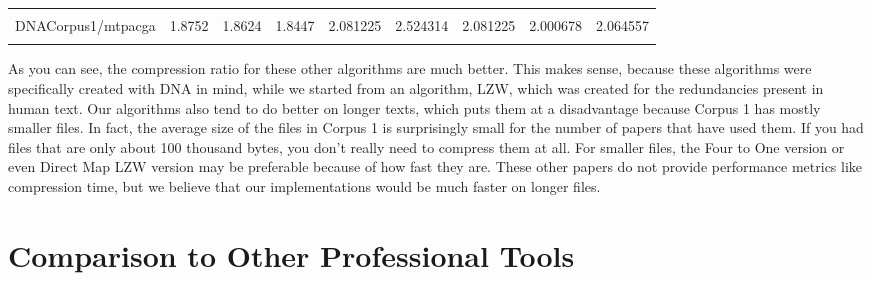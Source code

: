 \documentclass[12pt,twoside]{reedthesis}
\begin{document}
\begin{table}[!h]
{\begin{tabular}[t]{lrrrrrrrr}
\cellcolor{gray!6}{DNACorpus1/mpomtcg} & \cellcolor{gray!6}{1.9378} & \cellcolor{gray!6}{1.9058} & \cellcolor{gray!6}{1.8768} & \cellcolor{gray!6}{2.172671} & \cellcolor{gray!6}{2.485925} & \cellcolor{gray!6}{2.172671} & \cellcolor{gray!6}{2.000375} & \cellcolor{gray!6}{2.053449}\\
DNACorpus1/mtpacga & 1.8752 & 1.8624 & 1.8447 & 2.081225 & 2.524314 & 2.081225 & 2.000678 & 2.064557\\
\addlinespace
\cellcolor{gray!6}{DNACorpus1/vaccg} & \cellcolor{gray!6}{1.7614} & \cellcolor{gray!6}{1.7614} & \cellcolor{gray!6}{1.7649} & \cellcolor{gray!6}{2.108805} & \cellcolor{gray!6}{2.413347} & \cellcolor{gray!6}{2.108805} & \cellcolor{gray!6}{2.000365} & \cellcolor{gray!6}{2.065162}\\
\bottomrule
\end{tabular}}
\end{table}
As you can see, the compression ratio for these other algorithms are much better. This makes sense, because these algorithms were specifically created with DNA in mind, while we started from an algorithm, LZW, which was created for the redundancies present in human text. Our algorithms also tend to do better on longer texts, which puts them at a disadvantage because Corpus 1 has mostly smaller files. In fact, the average size of the files in Corpus 1 is surprisingly small for the number of papers that have used them. If you had files that are only about 100 thousand bytes, you don't really need to compress them at all. For smaller files, the Four to One version or even Direct Map LZW version may be preferable because of how fast they are. These other papers do not provide performance metrics like compression time, but we believe that our implementations would be much faster on longer files.

\hypertarget{comparison-to-other-professional-tools}{%
\section{Comparison to Other Professional Tools}\label{comparison-to-other-professional-tools}}
\end{document}
